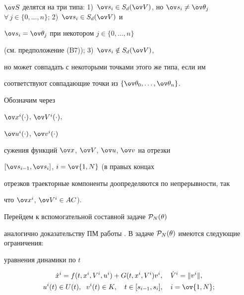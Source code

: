 $\ov S$ делятся на три типа: 1)~$\ov s_i\in


S_d(\ov V)$, но $\ov s_i\neq \ov\theta_j$ $\forall \,


j\in \{0,\dotsc,n\}$; 2)~$\ov s_i\in S_d(\ov V)$ и


$\ov s_i=\ov\theta_j$ при некотором $j\in \{0,\dotsc,n\}$


(см. предположение (B7)); 3)~$\ov s_i\notin S_d(\ov V)$,


но может совпадать с некоторыми точками этого же типа, если им


соответствуют совпадающие точки из $\{\ov


\theta_0,\dotsc,\ov\theta_n\}$.





Обозначим через


$\ov x^i(\cdot)$, $\ov V^i(\cdot)$,


$\ov u^i(\cdot)$, $\ov v^i(\cdot)$


сужения функций $\ov x$, $\ov V$, $\ov u$, $\ov v$ на отрезки


$[\ov s_{i-1},\ov s_i]$, $i=\ov{1,N}$ (в правых концах


отрезков траекторные компоненты доопределяются по непрерывности, так


что $\ov x^i$, $\ov V^i\in AC$).





Перейдем к вспомогательной составной задаче ${\cal P}_N(\theta)$


аналогично доказательству ПМ работы \cite{DS99}. В задаче ${\cal


P}_N(\theta)$ имеются следующие ограничения:





уравнения динамики по $t$


\begin{gather*}


\Dot{x}^i=f(t,x^i ,V^i,u^i)+G(t,x^i,V^i)v^i,


\quad \Dot V^i=\|v^i\|,\\


u^i(t)\in U(t),\ \; v^i(t)\in K,


\quad t\in [s_{i-1},s_i], \quad i=\ov{1,N};




\end{gather*}





